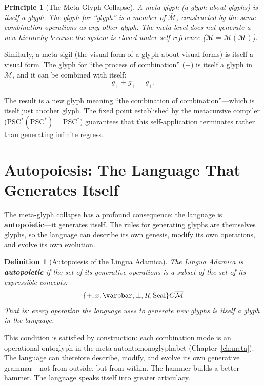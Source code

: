 \documentclass[12pt, letterpaper]{book}
\def\equiv{=}%
\def\otimes{x}%
\def\oplus{+}%
\def\subset{C}%
\def\circlearrowleft{R}%
\def\mathfrak#1{#1}%
\newtheorem{definition}{Definition}[chapter]
\newtheorem{principle}{Principle}[chapter]
\begin{document}
\begin{principle}[The Meta-Glyph Collapse]\label{pr:meta-glyph}
A meta-glyph (a glyph about glyphs) is itself a glyph. The glyph for ``glyph'' is a member of $\overline{\mathcal{M}}$, constructed by the same combination operations as any other glyph. The meta-level does not generate a new hierarchy because the system is closed under self-reference ($\mathcal{M} \equiv \mathcal{M}(\mathcal{M})$).
\end{principle}

Similarly, a meta-sigil (the visual form of a glyph about visual forms) is itself a visual form. The glyph for ``the process of combination'' ($\oplus$) is itself a glyph in $\overline{\mathcal{M}}$, and it can be combined with itself:
\[
\mathfrak{g}_\oplus \oplus \mathfrak{g}_\oplus = \mathfrak{g}_{\oplus^2}
\]

The result is a new glyph meaning ``the combination of combination''---which is itself just another glyph. The fixed point established by the metacursive compiler ($\mathrm{PSC}^*(\mathrm{PSC}^*) = \mathrm{PSC}^*$) guarantees that this self-application terminates rather than generating infinite regress.

\section{Autopoiesis: The Language That Generates Itself}

The meta-glyph collapse has a profound consequence: the language is \textbf{autopoietic}---it generates itself. The rules for generating glyphs are themselves glyphs, so the language can describe its own genesis, modify its own operations, and evolve its own evolution.

\begin{definition}[Autopoiesis of the Lingua Adamica]\label{def:autopoiesis}
The Lingua Adamica is \textbf{autopoietic} if the set of its generative operations is a subset of the set of its expressible concepts:
\[
\{\oplus, \otimes, \varobar, \perp, \circlearrowleft, \mathrm{Seal}\} \subset \overline{\mathcal{M}}
\]
That is: every operation the language uses to generate new glyphs is itself a glyph in the language.
\end{definition}

This condition is satisfied by construction: each combination mode is an operational ontoglyph in the meta-autontomonoglyphabet (Chapter~\ref{ch:meta}). The language can therefore describe, modify, and evolve its own generative grammar---not from outside, but from within. The hammer builds a better hammer. The language speaks itself into greater articulacy.
\end{document}
